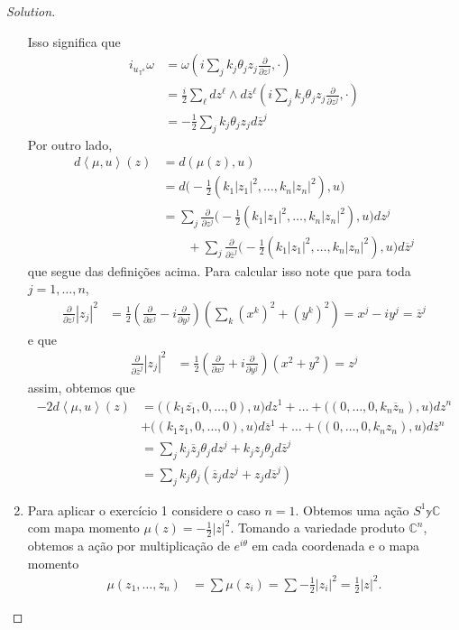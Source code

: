 \begin{proof}[Solution]
\begin{enumerate}[label=(\alph*)]
	Isso significa que
	\begin{align*}
	i_{u_{\mathbb{T}^n}}\omega&=\omega\left( i\sum_j k_j\theta_jz_j\frac{\partial }{\partial z^j},\cdot \right) \\
	&=\frac{i}{2}\sum_\ell dz^\ell\wedge d\overline{z}^\ell\left( i\sum_j k_j\theta_jz_j\frac{\partial }{\partial z^j},\cdot \right)\\
	&=-\frac{1}{2}\sum_{j}k_j\theta_jz_jd\overline{z}^j
	\end{align*}
	Por outro lado,
\begin{align*}
d\left<\mu,u\right>(z)&=d(\mu(z),u)\\
&=d\Big(-\frac{1}{2}(k_1|z_1|^2,\ldots,k_n|z_n|^2),u\Big)\\
&=\sum_j \frac{\partial }{\partial z^j}\Big(-\frac{1}{2}(k_1|z_1|^2,\ldots,k_n|z_n|^2),u\Big)dz^j\\
&\qquad +\sum_j \frac{\partial }{\partial \overline{z}^j}\Big(-\frac{1}{2}(k_1|z_1|^2,\ldots,k_n|z_n|^2),u\Big)d\overline{z}^j
\end{align*}
que segue das definições acima. Para calcular isso note que para toda $j=1,\ldots,n$,
\begin{align*}
\frac{\partial }{\partial z^j}|z_j|^2&=\frac{1}{2}\left(\frac{\partial }{\partial x^j}-i \frac{\partial }{\partial y^j}\right)\left(\sum_k (x^k)^2+(y^k)^2\right)=x^j-iy^j=\overline{z}^j
\end{align*}
e que
\begin{align*}
\frac{\partial }{\partial \overline{z}^j}|z_j|^2&=\frac{1}{2}\left(\frac{\partial }{\partial x^j}+i \frac{\partial }{\partial y^j}\right)(x^2+y^2)=z^j
\end{align*}
assim, obtemos que
\begin{align*}
-2d\left<\mu,u\right>(z)&=\Big((k_1\overline{z_1},0,\ldots,0),u\Big)dz^1+\ldots+\Big((0,\ldots,0,k_n\overline{z}_n),u\Big)dz^n\\
&+\Big((k_1z_1,0,\ldots,0),u\Big)d\overline{z}^1+\ldots+\Big((0,\ldots,0,k_nz_n),u\Big)d \overline{z}^n\\
&=\sum_j k_j\overline{z}_j\theta_jdz^j+k_jz_j\theta_jd\overline{z}^j\\
&=\sum_jk_j\theta_j(\overline{z}_jdz^j+z_jd\overline{z}^j)
\end{align*}

\item Para aplicar o exercício 1 considere o caso $n=1$. Obtemos uma ação $S^1\mathbb{y}\mathbb{C}$ com mapa momento $\mu(z)=-\frac{1}{2}|z|^2$. Tomando a variedade produto $\mathbb{C}^n$, obtemos a ação por  multiplicação de $e^{i\theta}$ em cada coordenada e o mapa momento
	\begin{align*}
	\mu(z_1,\ldots,z_n)&=\sum \mu(z_i)=\sum -\frac{1}{2}|z_i|^2=\frac{1}{2}|z|^2.
	\end{align*}
\end{enumerate}
\end{proof}


